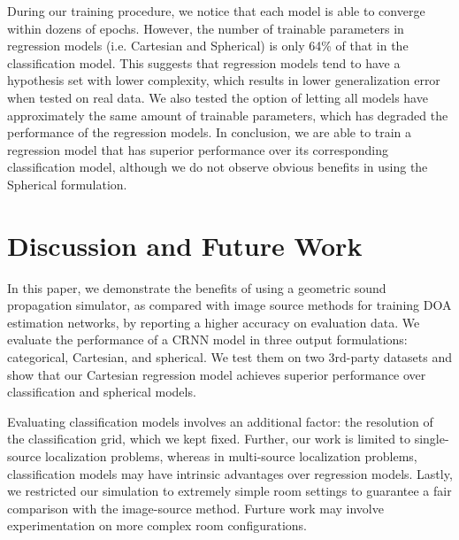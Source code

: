 \documentclass[a4paper]{article}
\begin{document}
During our training procedure, we notice that each model is able to converge within dozens of epochs. However, the number of trainable parameters in regression models (i.e. Cartesian and Spherical) is only 64\% of that in the classification model. This suggests that regression models tend to have a hypothesis set with lower complexity, which results in lower generalization error when tested on real data. We also tested the option of letting all models have approximately the same amount of trainable parameters, which has degraded the performance of the regression models. In conclusion, we are able to train a regression model that has superior performance over its corresponding classification model, although we do not observe obvious benefits in using the Spherical formulation. \section{Discussion and Future Work}
In this paper, we demonstrate the benefits of using a geometric sound propagation simulator, as compared with image source methods for training DOA estimation networks, by reporting a higher accuracy on evaluation data. We evaluate the performance of a CRNN model in three output formulations: categorical, Cartesian, and spherical. We test them on two 3rd-party datasets and show that our Cartesian regression model achieves superior performance over classification and spherical models.

Evaluating classification models involves an additional factor: the resolution of the classification grid, which we kept fixed. Further, our work is limited to single-source localization problems, whereas in multi-source localization problems, classification models may have intrinsic advantages over regression models. Lastly, we restricted our simulation to extremely simple room settings to guarantee a fair comparison with the image-source method. Furture work may involve experimentation on more complex room configurations.

%
 





\end{document}
